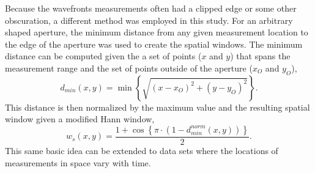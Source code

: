 Because the wavefronts measurements often had a clipped edge or some other obscuration, a different method was employed in this study.
For an arbitrary shaped aperture, the minimum distance from any given measurement location to the edge of the aperture was used to create the spatial windows.
The minimum distance can be computed given the a set of points ($x$ and $y$) that spans the measurement range and the set of points outside of the aperture ($x_O$ and $y_O$),
\begin{equation}
 d_{min}(x,y) = \min\left\{\sqrt{(x-x_{O})^2+(y-y_{O})^2}\right\} \textrm{.}
 \label{eqn:04_window_space_arb_dist}
\end{equation}
This distance is then normalized by the maximum value and the resulting spatial window given a modified Hann window,
\begin{equation}
 w_s(x,y) = \frac{1+\cos\left\{\pi\cdot\left(1-d_{min}^{norm}(x,y)\right)\right\}}{2} \textrm{.}
 \label{eqn:04_window_space_arb}
\end{equation}
This same basic idea can be extended to data sets where the locations of measurements in space vary with time.

